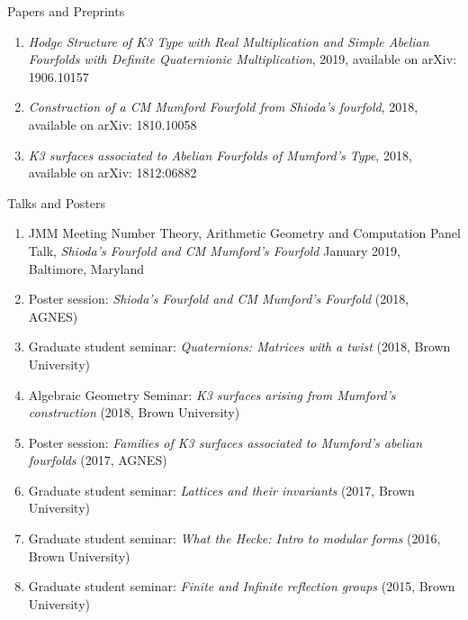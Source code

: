\documentclass{resume} %
\begin{document}
\begin{rSection}{Papers and Preprints}
\begin{enumerate}
\item \emph{Hodge Structure of K3 Type with Real Multiplication and Simple Abelian Fourfolds with Definite Quaternionic Multiplication}, 2019, available on arXiv: 1906.10157 
\item \emph{Construction of a CM Mumford Fourfold from Shioda's fourfold}, 2018, available on arXiv: 1810.10058
\item \emph{K3 surfaces associated to Abelian Fourfolds of Mumford's Type}, 2018, available on arXiv: 1812:06882
\end{enumerate}

\end{rSection}


\begin{rSection}{Talks and Posters}
\begin{enumerate}
\item JMM Meeting Number Theory, Arithmetic Geometry and Computation Panel Talk, \emph{Shioda's Fourfold and CM Mumford's Fourfold} January 2019, Baltimore, Maryland
\item Poster session: \emph{Shioda's Fourfold and CM Mumford's Fourfold} (2018, AGNES)
\item Graduate student seminar: \emph{Quaternions: Matrices with a twist} (2018, Brown University)
\item Algebraic Geometry Seminar: \emph{K3 surfaces arising from Mumford's construction} (2018, Brown University)
\item Poster session: \emph{Families of K3 surfaces associated to Mumford's abelian fourfolds} (2017, AGNES)
\item Graduate student seminar: \emph{Lattices and their invariants} (2017, Brown University)
\item Graduate student seminar: \emph{What the Hecke: Intro to modular forms} (2016, Brown University)
\item Graduate student seminar: \emph{Finite and Infinite reflection groups} (2015, Brown University)

\end{enumerate}



\end{rSection}
\end{document}
